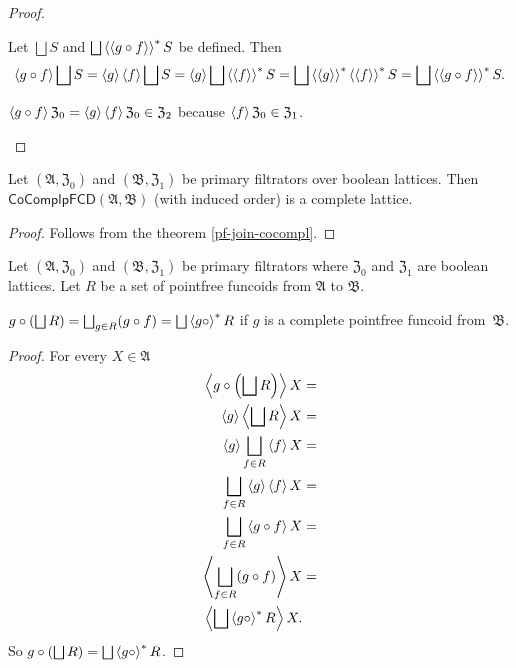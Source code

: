 \begin{proof}
~
\begin{widedisorder}
\item [{\ref{pf-compl-comp}}] Let $\bigsqcup S$ and $\bigsqcup\rsupfun{\supfun{g\circ f}}S$
be defined. Then
\[
\supfun{g\circ f}\bigsqcup S=\supfun g\supfun f\bigsqcup S=\supfun g\bigsqcup\rsupfun{\supfun f}S=\bigsqcup\rsupfun{\supfun g}\rsupfun{\supfun f}S=\bigsqcup\rsupfun{\supfun{g\circ f}}S.
\]

\item [{\ref{pf-cocompl-comp}}] $\left\langle g\circ f\right\rangle\mathfrak{Z}_{0}=\left\langle g\right\rangle\left\langle f\right\rangle\mathfrak{Z}_{0}\in\mathfrak{Z}_{2}$
because $\left\langle f\right\rangle\mathfrak{Z}_{0}\in\mathfrak{Z}_{1}$.
\end{widedisorder}
\end{proof}
\begin{prop}
Let $(\mathfrak{A},\mathfrak{Z}_{0})$ and $(\mathfrak{B},\mathfrak{Z}_{1})$
be primary filtrators over boolean lattices. Then $\mathsf{CoComplpFCD}(\mathfrak{A},\mathfrak{B})$
(with induced order) is a complete lattice.\end{prop}
\begin{proof}
Follows from the theorem \ref{pf-join-cocompl}.\end{proof}
\begin{thm}
Let $(\mathfrak{A},\mathfrak{Z}_{0})$ and $(\mathfrak{B},\mathfrak{Z}_{1})$
be primary filtrators where $\mathfrak{Z}_{0}$ and $\mathfrak{Z}_{1}$
are boolean lattices. Let $R$ be a set of pointfree funcoids from
$\mathfrak{A}$ to $\mathfrak{B}$.

$g\circ\left(\bigsqcup R\right)=\bigsqcup_{g\in R}(g\circ f)=\bigsqcup\rsupfun{g\circ}R$
if $g$ is a complete pointfree funcoid from~$\mathfrak{B}$.\end{thm}
\begin{proof}
For every $X\in\mathfrak{A}$
\begin{align*}
\supfun{g\circ\left(\bigsqcup R\right)}X & =\\
\supfun g\supfun{\bigsqcup R}X & =\\
\supfun g\bigsqcup_{f\in R}\supfun fX & =\\
\bigsqcup_{f\in R}\supfun g\supfun fX & =\\
\bigsqcup_{f\in R}\supfun{g\circ f}X & =\\
\supfun{\bigsqcup_{f\in R}(g\circ f)}X & =\\
\supfun{\bigsqcup\rsupfun{g\circ}R}X.
\end{align*}
So $g\circ\left(\bigsqcup R\right)=\bigsqcup\rsupfun{g\circ}R$.
\end{proof}

